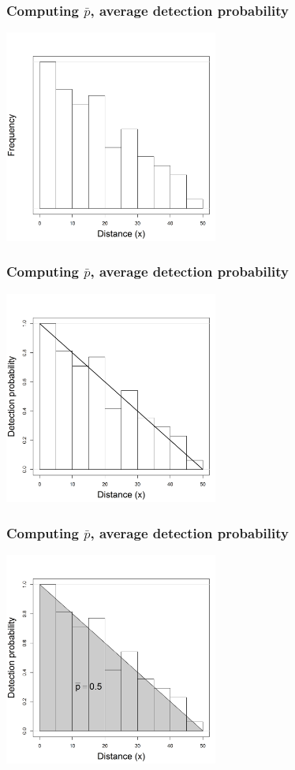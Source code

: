 \documentclass[color=usenames,dvipsnames]{beamer}\usepackage[]{graphicx}\usepackage[]{color}
\begin{document}
\begin{frame}
  \frametitle{Computing $\bar{p}$, average detection probability}
\begin{center}
  \includegraphics[width=7cm]{figs/detfun0-1}
\end{center}
\end{frame}




\begin{frame}
  \frametitle{Computing $\bar{p}$, average detection probability}
\begin{center}
  \includegraphics[width=7cm]{figs/detfun0-2}
\end{center}
\end{frame}




\begin{frame}
  \frametitle{Computing $\bar{p}$, average detection probability}
\begin{center}
  \includegraphics[width=7cm]{figs/detfun0-3}
\end{center}
\end{frame}
\end{document}
